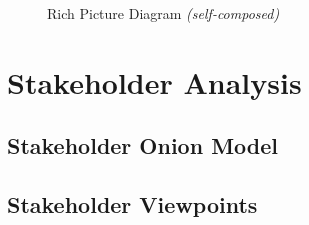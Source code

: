 \begin{figure}[h!]
\centering
{}
\caption{Rich Picture Diagram \textit{(self-composed)}}
\label{fig:rich-picture}
\end{figure}

\section{Stakeholder Analysis}

\subsection{Stakeholder Onion Model}

\subsection{Stakeholder Viewpoints}


